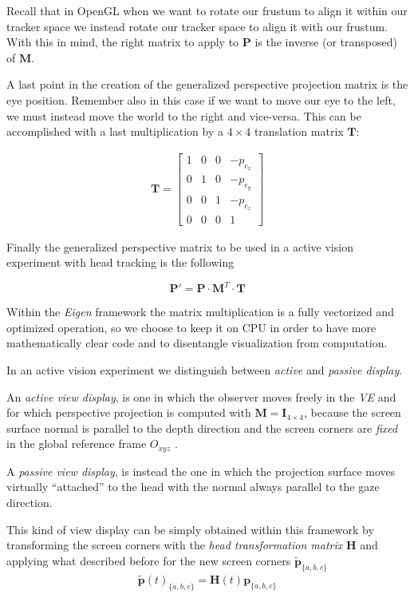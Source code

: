 \documentclass[acmtocl,acmnow]{acmtrans2m}
\begin{document}
Recall that in OpenGL when we want to rotate our frustum to align it within our
tracker space we instead rotate our tracker space to align it with our frustum.
With this in mind, the right matrix to apply 
to $\mathbf{P}$ is the inverse (or transposed) of $\mathbf{M}$.

A last point in the creation of the generalized perspective projection matrix is
the eye position. Remember also in this case if we want to move our eye to the
left, we must instead
move the world to the right and vice-versa. This can be accomplished with a last
multiplication by a $4 \times 4$ translation matrix $\mathbf{T}$:

\begin{align*}
\mathbf{T} =
\begin{bmatrix}
1 & 0 & 0 & -p_{e_x} \\
0 & 1 & 0 & -p_{e_y} \\
0 & 0 & 1 & -p_{e_z} \\
0 & 0 & 0 & 1 
\end{bmatrix}
\end{align*}

Finally the generalized perspective matrix to be used in a active vision
experiment with head tracking is the following

\begin{equation}
\mathbf{P'} = \mathbf{P} \cdot \mathbf{M}^T \cdot \mathbf{T}
\end{equation}

Within the \emph{Eigen} framework the matrix multiplication is a fully
vectorized and optimized operation, so we choose to keep it on CPU in order to have
more mathematically clear code and 
to disentangle visualization from computation.

In an active vision experiment we distinguish 
between \emph{active} and \emph{passive display}.

An \emph{active view display}, is one in which the observer moves freely in the
\emph{VE} and for which perspective projection is
computed with $\mathbf{M} = \mathbf{I}_{4\times 4}$, because the screen surface
normal is parallel to the depth direction and the screen corners are \emph{fixed} in
the global reference frame $O_{xyz}$ .

A \emph{passive view display}, is instead the one in which the projection
surface moves virtually ``attached'' to the head with the normal always parallel
to the gaze direction.

This kind of view display can be simply obtained within this framework by
transforming the screen corners with the \emph{head transformation matrix}
$\mathbf{H}$ and applying what described before for the new screen corners
$\mathbf{\tilde{p}}_{\{a,b,c \}}$
\begin{eqnarray}
\mathbf{\tilde{p}}(t)_{\{a,b,c\}} = \mathbf{H}(t) \mathbf{p}_{\{a,b,c\}}
\end{eqnarray}
\end{document}
